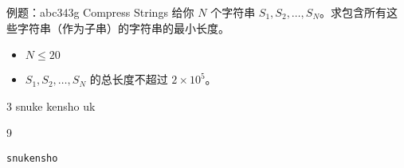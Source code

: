 \documentclass{ctexbeamer}
\begin{document}
\begin{frame}[fragile]{例题：abc343g Compress Strings}
  给你 $N$ 个字符串 $S_1, S_2, \dots, S_N$。求包含所有这些字符串（作为子串）的字符串的最小长度。
  \begin{itemize}
    \item $N \le 20$
    \item $S_1, S_2, \dots, S_N$ 的总长度不超过 $2\times 10^5$。
  \end{itemize}
  \begin{tcolorbox}[sidebyside,title=样例]
    \begin{cverb}
    3
    snuke
    kensho
    uk      
    \end{cverb}
    \tcblower
    \begin{cverb}
    9
    \end{cverb}
  \end{tcolorbox}
  \verb|snukensho|
\end{frame}
\end{document}
